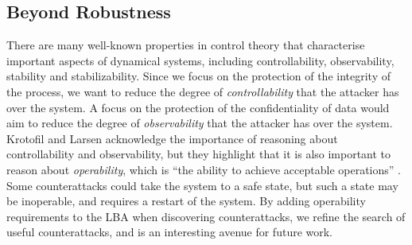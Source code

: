 {{%


\subsection{Beyond Robustness}
There are many well-known properties in control theory that characterise important aspects of dynamical systems, including {controllability, observability, stability} and {stabilizability}. Since we focus on the protection of the integrity of the process, we want to reduce the degree of \emph{controllability} that the attacker has over the system. A focus on the protection of the confidentiality of data would aim to reduce the degree of \emph{observability} that the attacker has over the system. Krotofil and Larsen acknowledge the importance of reasoning about {controllability} and {observability}, but they highlight that it is also important to reason about \emph{operability}, which is ``the ability to achieve acceptable operations'' \cite{krotofil2015rocking}. Some counterattacks could take the system to a safe state, but such a state may be inoperable, and requires a restart of the system. By adding operability requirements to the LBA when discovering counterattacks, we refine the search of useful counterattacks, and is an interesting avenue for future work. 
 
}}
